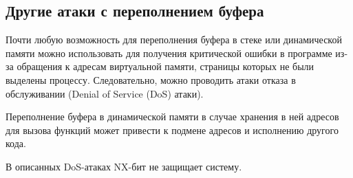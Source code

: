 \subsection{Другие атаки с переполнением буфера}

Почти любую возможность для переполнения буфера в стеке или динамической памяти можно использовать для получения критической ошибки в программе из-за обращения к адресам виртуальной памяти, страницы которых не были выделены процессу. Следовательно, можно проводить атаки отказа в обслуживании (Denial of Service (DoS) атаки).

Переполнение буфера в динамической памяти в случае хранения в ней адресов для вызова функций может привести к подмене адресов и исполнению другого кода.

В описанных DoS-атаках NX-бит не защищает систему.
